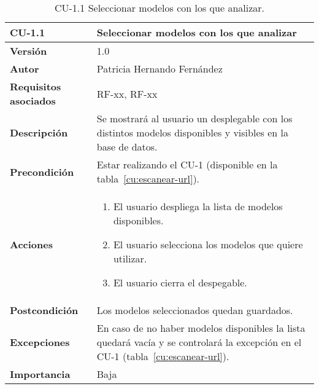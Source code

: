 \begin{table}[p]
	\centering
	\begin{tabularx}{\linewidth}{ p{} p{} }
		\toprule
		\textbf{CU-1.1}    & \textbf{Seleccionar modelos con los que analizar}\\
		\toprule
		\textbf{Versión}              & 1.0    \\
		\textbf{Autor}                & Patricia Hernando Fernández \\
		\textbf{Requisitos asociados} & RF-xx, RF-xx \\
		\textbf{Descripción}          & Se mostrará al usuario un desplegable con los distintos modelos disponibles y visibles en la base de datos. \\
		\textbf{Precondición}         & Estar realizando el CU-1 (disponible en la tabla~\ref{cu:escanear-url}). \\
		\textbf{Acciones}             &
		\begin{enumerate}
			\def\labelenumi{\arabic{enumi}.}
			\tightlist
			\item El usuario despliega la lista de modelos disponibles.
			\item El usuario selecciona los modelos que quiere utilizar.
			\item El usuario cierra el despegable.
		\end{enumerate}\\
		\textbf{Postcondición}        & Los modelos seleccionados quedan guardados. \\
		\textbf{Excepciones}          & En caso de no haber modelos disponibles la lista quedará vacía y se controlará la excepción en el CU-1 (tabla~\ref{cu:escanear-url}). \\
		\textbf{Importancia}          & Baja \\
		\bottomrule
	\end{tabularx}
	\caption{CU-1.1 Seleccionar modelos con los que analizar.}
	\label{cu:seleccionar-modelos-ml}
\end{table}

